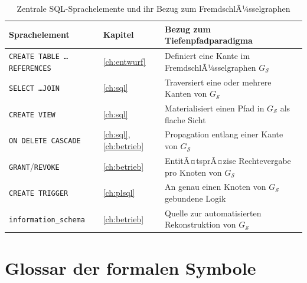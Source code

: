 ﻿\documentclass[a4paper,12pt]{report}
\theoremstyle{definition}
\theoremstyle{remark}
\begin{document}
\begin{table}[H]
\centering
\small
\begin{tabular}{@{}llp{6cm}@{}}
\toprule
\textbf{Sprachelement} & \textbf{Kapitel} & \textbf{Bezug zum Tiefenpfadparadigma} \\
\midrule
\texttt{CREATE TABLE \ldots REFERENCES} & \ref{ch:entwurf} &
  Definiert eine Kante im FremdschlÃ¼sselgraphen $G_{\mathcal{S}}$ \\
\texttt{SELECT \ldots JOIN} & \ref{ch:sql} &
  Traversiert eine oder mehrere Kanten von $G_{\mathcal{S}}$ \\
\texttt{CREATE VIEW} & \ref{ch:sql} &
  Materialisiert einen Pfad in $G_{\mathcal{S}}$ als flache Sicht \\
\texttt{ON DELETE CASCADE} & \ref{ch:sql}, \ref{ch:betrieb} &
  Propagation entlang einer Kante von $G_{\mathcal{S}}$ \\
\texttt{GRANT}/\texttt{REVOKE} & \ref{ch:betrieb} &
  EntitÃ¤tsprÃ¤zise Rechtevergabe pro Knoten von $G_{\mathcal{S}}$ \\
\texttt{CREATE TRIGGER} & \ref{ch:plsql} &
  An genau einen Knoten von $G_{\mathcal{S}}$ gebundene Logik \\
\texttt{information\_schema} & \ref{ch:betrieb} &
  Quelle zur automatisierten Rekonstruktion von $G_{\mathcal{S}}$ \\
\bottomrule
\end{tabular}
\caption{Zentrale SQL-Sprachelemente und ihr Bezug zum FremdschlÃ¼sselgraphen}
\label{tab:sql-uebersicht}
\end{table}

\section{Glossar der formalen Symbole}
\end{document}
